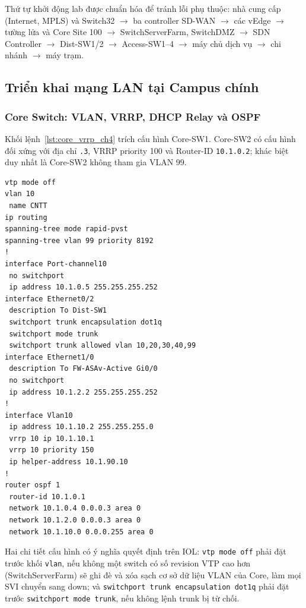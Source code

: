Thứ tự khởi động lab được chuẩn hóa để tránh lỗi phụ thuộc: nhà cung cấp (Internet, MPLS) và Switch32 $\rightarrow$ ba controller SD-WAN $\rightarrow$ các vEdge $\rightarrow$ tường lửa và Core Site 100 $\rightarrow$ SwitchServerFarm, SwitchDMZ $\rightarrow$ SDN Controller $\rightarrow$ Dist-SW1/2 $\rightarrow$ Access-SW1--4 $\rightarrow$ máy chủ dịch vụ $\rightarrow$ chi nhánh $\rightarrow$ máy trạm.

\subsection{Triển khai mạng LAN tại Campus chính}

\subsubsection{Core Switch: VLAN, VRRP, DHCP Relay và OSPF}

Khối lệnh~\ref{lst:core_vrrp_ch4} trích cấu hình Core-SW1. Core-SW2 có cấu hình đối xứng với địa chỉ \texttt{.3}, VRRP priority 100 và Router-ID \texttt{10.1.0.2}; khác biệt duy nhất là Core-SW2 không tham gia VLAN 99.

\begin{lstlisting}[style=customcode,caption={Trích cấu hình Core-SW1},label={lst:core_vrrp_ch4}]
vtp mode off
vlan 10
 name CNTT
ip routing
spanning-tree mode rapid-pvst
spanning-tree vlan 99 priority 8192
!
interface Port-channel10
 no switchport
 ip address 10.1.0.5 255.255.255.252
interface Ethernet0/2
 description To Dist-SW1
 switchport trunk encapsulation dot1q
 switchport mode trunk
 switchport trunk allowed vlan 10,20,30,40,99
interface Ethernet1/0
 description To FW-ASAv-Active Gi0/0
 no switchport
 ip address 10.1.2.2 255.255.255.252
!
interface Vlan10
 ip address 10.1.10.2 255.255.255.0
 vrrp 10 ip 10.1.10.1
 vrrp 10 priority 150
 ip helper-address 10.1.90.10
!
router ospf 1
 router-id 10.1.0.1
 network 10.1.0.4 0.0.0.3 area 0
 network 10.1.2.0 0.0.0.3 area 0
 network 10.1.10.0 0.0.0.255 area 0
\end{lstlisting}

Hai chi tiết cấu hình có ý nghĩa quyết định trên IOL: \texttt{vtp mode off} phải đặt trước khối \texttt{vlan}, nếu không một switch có số revision VTP cao hơn (SwitchServerFarm) sẽ ghi đè và xóa sạch cơ sở dữ liệu VLAN của Core, làm mọi SVI chuyển sang down; và \texttt{switchport trunk encapsulation dot1q} phải đặt trước \texttt{switchport mode trunk}, nếu không lệnh trunk bị từ chối.

